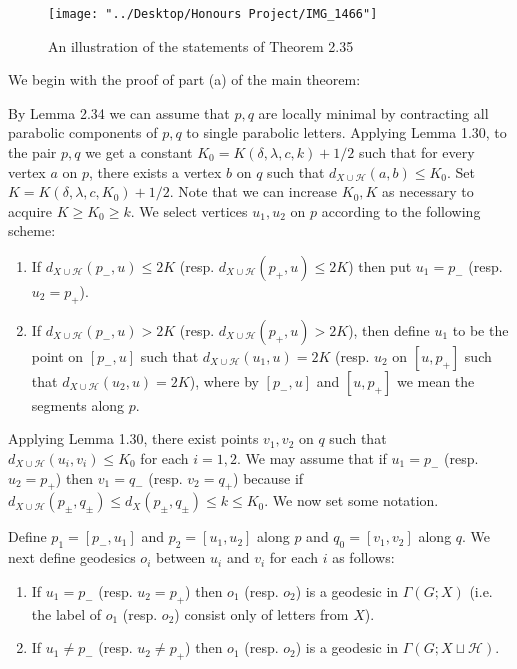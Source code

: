 \documentclass[12pt]{article}
\newcommand{\vs}{\vskip10pt}
\begin{document}
\begin{figure} [H]
	\centering
	\texttt{[image: "../Desktop/Honours Project/IMG\_1466"]}
	\caption{An illustration of the statements of Theorem 2.35}
	\label{fig:img1466}
\end{figure}

	We begin with the proof of part (a) of the main theorem: 
	
	\vs
	
	By Lemma 2.34 we can assume that $p,q$ are locally minimal by contracting all parabolic components of $p,q$ to single parabolic letters. Applying Lemma 1.30, to the pair $p,q$ we get a constant $K_0 = K(\delta, \lambda, c, k) + 1/2$ such that for every vertex $a$ on $p$, there exists a vertex $b$ on $q$ such that $d_{X \cup \mathcal{H}}(a,b) \leq K_0$. Set $K = K(\delta, \lambda, c, K_0) + 1/2$. Note that we can increase $K_0, K$ as necessary to acquire $K \geq K_0 \geq k$. We select vertices $u_1, u_2$ on $p$ according to the following scheme: 
	
	\begin{enumerate}[label = (\roman*)]
		\item If $d_{X \cup \mathcal{H}}(p_-, u) \leq 2K$ (resp. $d_{X \cup \mathcal{H}}(p_+, u) \leq 2K$) then put $u_1 = p_-$ (resp. $u_2 = p_+$). 
		\item If $d_{X \cup \mathcal{H}}(p_-, u) > 2K$ (resp. $d_{X \cup \mathcal{H}}(p_+, u)> 2K$), then define $u_1$ to be the point on $[p_-, u]$ such that $d_{X \cup \mathcal{H}}(u_1, u) = 2K$ (resp. $u_2$ on $[u, p_+]$ such that $d_{X \cup \mathcal{H}}(u_2, u) = 2K$), where by $[p_-, u]$ and $[u, p_+]$ we mean the segments along $p$. 
	\end{enumerate}

	Applying Lemma 1.30, there exist points $v_1, v_2$ on $q$ such that $d_{X \cup \mathcal{H}}(u_i, v_i) \leq K_0$ for each $i = 1,2$. We may assume that if $u_1 = p_-$ (resp. $u_2 = p_+$) then $v_1 = q_-$ (resp. $v_2 = q_+$) because if $d_{X \cup \mathcal{H}}(p_{\pm}, q_{\pm}) \leq d_X(p_{\pm}, q_{\pm}) \leq k \leq K_0$. We now set some notation.
	
	\vs 
	
	Define $p_1 = [p_-, u_1]$ and $p_2 = [u_1, u_2]$ along $p$ and $q_0 = [v_1, v_2]$ along $q$. We next define geodesics $o_i$ between $u_i$ and $v_i$ for each $i$ as follows: 
	
	\begin{enumerate} [label = (\roman*)]
		\item If $u_1 = p_-$ (resp. $u_2 = p_+$) then $o_1$ (resp. $o_2$) is a geodesic in $\Gamma(G; X)$ (i.e. the label of $o_1$ (resp. $o_2$) consist only of letters from $X$).
		\item If $u_1 \neq p_-$ (resp. $u_2 \neq p_+$) then $o_1$ (resp. $o_2$) is a geodesic in $\Gamma(G; X \sqcup \mathcal{H})$. 
	\end{enumerate}
\end{document}
